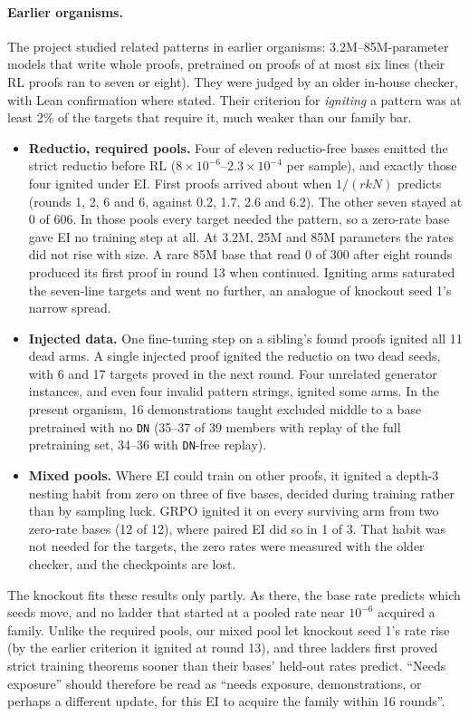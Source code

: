 \paragraph{Earlier organisms.} The project studied related patterns in earlier organisms: 3.2M--85M-parameter models
that write whole proofs, pretrained on proofs of at most six lines (their RL proofs ran to seven or eight). They were
judged by an older in-house checker, with Lean confirmation where stated. Their criterion for \emph{igniting} a pattern
was at least 2\% of the targets that require it, much weaker than our family bar.
\begin{itemize}
\item \textbf{Reductio, required pools.} Four of eleven reductio-free bases emitted the strict reductio before RL
($8\times10^{-6}$--$2.3\times10^{-4}$ per sample), and exactly those four ignited under EI. First proofs arrived about
when $1/(rkN)$ predicts (rounds 1, 2, 6 and 6, against 0.2, 1.7, 2.6 and 6.2). The other seven stayed at 0 of 606.
In those pools every target needed the pattern, so a zero-rate base gave EI no training step at all. At 3.2M, 25M and
85M parameters the rates did not rise with size. A rare 85M base that read 0 of 300 after eight rounds produced its
first proof in round 13 when continued. Igniting arms saturated the seven-line targets and went no further, an analogue
of knockout seed 1's narrow spread.
\item \textbf{Injected data.} One fine-tuning step on a sibling's found proofs ignited all 11 dead arms. A single injected
proof ignited the reductio on two dead seeds, with 6 and 17 targets proved in the next round. Four unrelated generator
instances, and even four invalid pattern strings, ignited some arms. In the present organism, 16 demonstrations taught
excluded middle to a base pretrained with no \texttt{DN} (35--37 of 39 members with replay of the full pretraining set,
34--36 with \texttt{DN}-free replay).
\item \textbf{Mixed pools.} Where EI could train on other proofs, it ignited a depth-3 nesting habit from zero on three
of five bases, decided during training rather than by sampling luck. GRPO ignited it on every surviving arm from two
zero-rate bases (12 of 12), where paired EI did so in 1 of 3. That habit was not needed for the targets, the zero rates
were measured with the older checker, and the checkpoints are lost.
\end{itemize}
The knockout fits these results only partly. As there, the base rate predicts which seeds move, and no ladder that
started at a pooled rate near $10^{-6}$ acquired a family. Unlike the required pools, our mixed pool let knockout
seed 1's rate rise (by the earlier criterion it ignited at round 13), and three ladders first proved strict training
theorems sooner than their bases' held-out rates predict. ``Needs exposure'' should therefore be read as ``needs exposure,
demonstrations, or perhaps a different update, for this EI to acquire the family within 16 rounds''.


